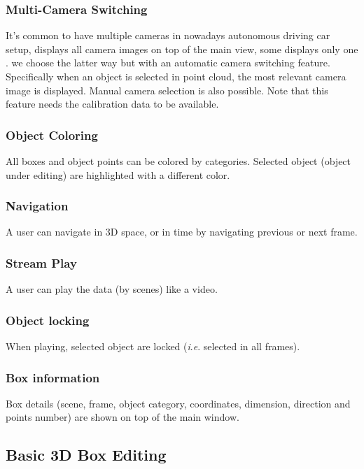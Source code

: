 \documentclass[letterpaper, 10 pt, conference]{ieeeconf}  %
\begin{document}
\subsubsection{Multi-Camera Switching}
It's common to have multiple cameras in nowadays autonomous driving car setup, \cite{Zimmer20193DBA} displays all camera images on top of the main view, some displays only one \cite{scale}. we choose the latter way but with an automatic camera switching feature. Specifically when an object is selected in point cloud, the most relevant camera image is displayed. Manual camera selection is also possible. Note that this feature needs the calibration data to be available.

\subsubsection{Object Coloring}
All boxes and object points can be colored by categories. Selected object (object under editing) are highlighted with a different color.

\subsubsection{Navigation}
\label{section:navigation}
A user can navigate in 3D space, or in time  by navigating previous or next frame. 

\subsubsection{Stream Play}
\label{section:streamplay}
A user can play the data (by scenes) like a video.

\subsubsection{Object locking}
\label{section:object-locking}
When playing, selected object are locked (\textit{i}.\textit{e}. selected in all frames).

\subsubsection{Box information}
Box details (scene, frame, object category, coordinates, dimension, direction and points number) are shown on top of the main window.
 
\subsection{Basic 3D Box Editing}
\end{document}
